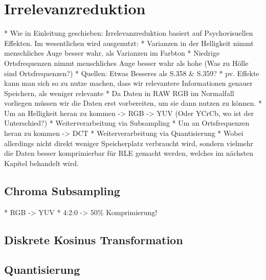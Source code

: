 \chapter{Irrelevanzreduktion}
\label{kap:Irrelevanzreduktion}

* Wie in Einleitung geschieben: Irrelevanzreduktion basiert auf Psychovisuellen Effekten. Im wesentlichen wird ausgenutzt:
	* Varianzen in der Helligkeit nimmt menschliches Auge besser wahr, als Varianzen im Farbton
	* Niedrige Ortsfrequenzen nimmt menschliches Auge besser wahr als hohe (Was zu Hölle sind Ortsfrequenzen?)
	* Quellen: Etwas Besseres als \cite{dankmeier_grundkurs_2006} S.358 \& S.359?
* pv. Effekte kann man sich so zu nutze machen, dass wir relevantere Informationen genauer Speichern, als weniger relevante
* Da Daten in RAW RGB im Normalfall vorliegen müssen wir die Daten erst vorbereiten, um sie dann nutzen zu können.
	* Um an Helligkeit heran zu kommen -> RGB -> YUV (Oder YCrCb, wo ist der Unterschied?)
		* Weiterverarbeitung via Subsampling
	* Um an Ortsfrequenzen heran zu kommen -> DCT
		* Weiterverarbeitung via Quantisierung
		* Wobei allerdings nicht direkt weniger Speicherplatz verbraucht wird, sondern vielmehr die Daten besser komprimierbar für RLE gemacht werden, welches im nächsten Kapitel behandelt wird.

\section{Chroma Subsampling}

* RGB -> YUV
* 4:2:0 -> 50\% Komprimierung!

\section{Diskrete Kosinus Transformation}

\section{Quantisierung}
